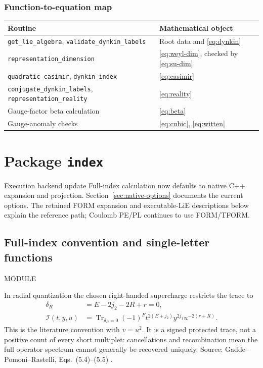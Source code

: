 \documentclass[11pt,a4paper]{article}
\numberwithin{equation}{section}
\newcommand{\code}[1]{{\small\nolinkurl{#1}}}
\newcommand{\file}[1]{\par{\small\sffamily\color{muted}MODULE \quad\texttt{\detokenize{#1}}}\par}
\newcommand{\Tr}{\operatorname{Tr}}
\newcommand{\src}[1]{{\small\color{muted}Source: #1.}\par}
\begin{document}
\subsubsection{Function-to-equation map}
\begin{tabularx}{\textwidth}{@{}Yp{43mm}@{}}
\toprule Routine & Mathematical object\\\midrule
\code{get_lie_algebra}, \code{validate_dynkin_labels} & Root data and \eqref{eq:dynkin}\\
\code{representation_dimension} & \eqref{eq:weyl-dim}, checked by \eqref{eq:su-dim}\\
\code{quadratic_casimir}, \code{dynkin_index} & \eqref{eq:casimir}\\
\code{conjugate_dynkin_labels}, \code{representation_reality} & \eqref{eq:reality}\\
Gauge-factor beta calculation & \eqref{eq:beta}\\
Gauge-anomaly checks & \eqref{eq:cubic}, \eqref{eq:witten}\\\bottomrule
\end{tabularx}

\clearpage
\section{Package \texttt{index}}\label{sec:index}
\begin{note}{Execution backend update}
Full-index calculation now defaults to native C++ expansion and projection.
Section~\ref{sec:native-options} documents the current options. The retained
FORM expansion and executable-LiE descriptions below explain the reference
path; Coulomb PE/PL continues to use FORM/TFORM.
\end{note}
\subsection{Full-index convention and single-letter functions}
\file{index/n2_theory_index.py}
In radial quantization the chosen right-handed supercharge restricts the trace to
\begin{align}
 \delta_R&=E-2j_2-2R+r=0,\label{eq:delta}\\
 \mathcal I(t,y,u)&=\Tr_{\delta_R=0}(-1)^F
 t^{2(E+j_2)}y^{2j_1}u^{-2(r+R)}.\label{eq:full-trace}
\end{align}
This is the literature convention with $v=u^2$. It is a signed protected trace,
not a positive count of every short multiplet: cancellations and recombination
mean the full operator spectrum cannot generally be recovered uniquely.
\src{Gadde--Pomoni--Rastelli, Eqs.~(5.4)--(5.5) \cite{gpr}}
\end{document}
